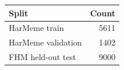 \begin{tabular}{lr}
\toprule
Split & Count \\
\midrule
HarMeme train & 5611 \\
HarMeme validation & 1402 \\
FHM held-out test & 9000 \\
\bottomrule
\end{tabular}
